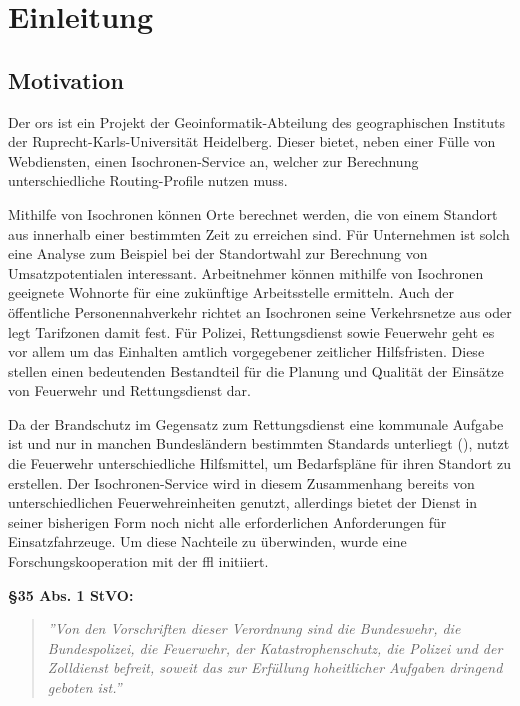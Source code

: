 \section{Einleitung}

\subsection{Motivation}
Der \gls{ors} ist ein Projekt der Geoinformatik-Abteilung des geographischen Instituts der Ruprecht-Karls-Universität Heidelberg.
Dieser bietet, neben einer Fülle von Webdiensten, einen Isochronen-Service an, welcher zur Berechnung unterschiedliche Routing-Profile nutzen muss.\par
Mithilfe von Isochronen können Orte berechnet werden, die von einem Standort aus innerhalb einer bestimmten Zeit zu erreichen sind.
Für Unternehmen ist solch eine Analyse zum Beispiel bei der Standortwahl zur Berechnung von Umsatzpotentialen interessant.
Arbeitnehmer können mithilfe von Isochronen geeignete Wohnorte für eine zukünftige Arbeitsstelle ermitteln.
Auch der öffentliche Personennahverkehr richtet an Isochronen seine Verkehrsnetze aus oder legt Tarifzonen damit fest.
Für Polizei, Rettungsdienst sowie Feuerwehr geht es vor allem um das Einhalten amtlich vorgegebener zeitlicher Hilfsfristen.
Diese stellen einen bedeutenden Bestandteil für die Planung und Qualität der Einsätze von Feuerwehr und Rettungsdienst dar.\par
Da der Brandschutz im Gegensatz zum Rettungsdienst eine kommunale Aufgabe ist und nur in manchen Bundesländern bestimmten Standards unterliegt (\cite{bedarfsplan}), nutzt die Feuerwehr unterschiedliche Hilfsmittel, um Bedarfspläne für ihren Standort zu erstellen.
Der Isochronen-Service wird in diesem Zusammenhang bereits von unterschiedlichen Feuerwehreinheiten genutzt, allerdings bietet der Dienst in seiner bisherigen Form noch nicht alle erforderlichen Anforderungen für Einsatzfahrzeuge.
Um diese Nachteile zu überwinden, wurde eine Forschungskooperation mit der \gls{ffl} initiiert.
\vspace{1.2cm}

\textbf{§35 Abs. 1 StVO:}
\begin{quotation}
\label{cit:STVO}
{\itshape\rmfamily ''Von den Vorschriften dieser Verordnung sind die Bundeswehr, die Bundespolizei, die Feuerwehr, der Katastrophenschutz, die Polizei und der Zolldienst befreit, soweit das zur Erfüllung hoheitlicher Aufgaben dringend geboten ist.''}
\end{quotation}

